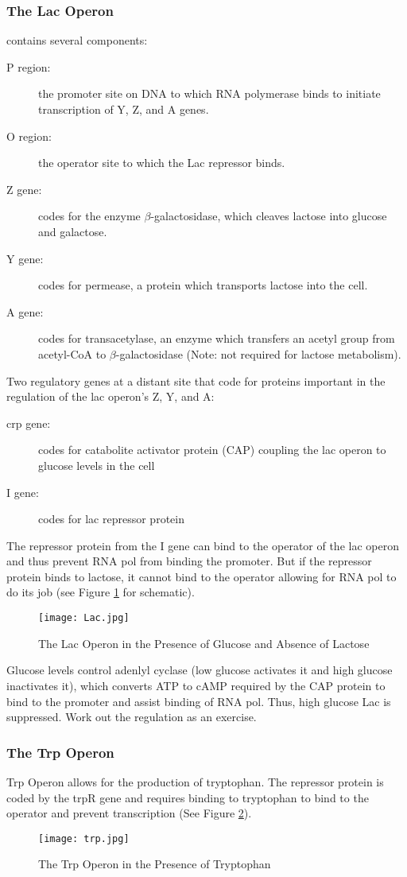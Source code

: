 \documentclass[../Bio_chemistryReview.tex]{subfiles}
\begin{document}
\subsubsection{The Lac Operon} contains several components:
\begin{description}
  \item[P region:] the promoter site on DNA to which RNA polymerase binds to
    initiate transcription of Y, Z, and A genes.
  \item[O region:] the operator site to which the Lac repressor binds.
  \item[Z gene:] codes for the enzyme $ \beta $-galactosidase, which cleaves
    lactose into glucose and galactose.
  \item[Y gene:] codes for permease, a protein which transports lactose into the
    cell.
  \item[A gene:] codes for transacetylase, an enzyme which transfers an acetyl
    group from acetyl-CoA to $ \beta $-galactosidase (Note: not required for
    lactose metabolism).
\end{description}
Two regulatory genes at a distant site that code for proteins important in the
regulation of the lac operon's Z, Y, and A:
\begin{description}
  \item[crp gene:] codes for catabolite activator protein (CAP) coupling the lac
    operon to glucose levels in the cell
  \item[I gene:] codes for lac repressor protein
\end{description}

The repressor protein from the I gene can bind to the operator of the lac operon
and thus prevent RNA pol from binding the promoter. But if the repressor protein
binds to lactose, it cannot bind to the operator allowing for RNA pol to do its
job (see Figure \ref{fig:lac} for schematic).\par
\begin{figure}[H]
  \centering
  \texttt{[image: Lac.jpg]}
  \caption{The Lac Operon in the Presence of Glucose and Absence of Lactose}
  \label{fig:lac}
\end{figure}
Glucose levels control adenlyl cyclase (low glucose activates it and high
glucose inactivates it), which converts ATP to cAMP required by the CAP protein
to bind to the promoter and assist binding of RNA pol. Thus, high glucose \imp
Lac is suppressed. Work out the regulation as an exercise.

\subsubsection{The Trp Operon}
Trp Operon allows for the production of tryptophan. The repressor protein is
coded by the trpR gene and requires binding to tryptophan to bind to the
operator and prevent transcription (See Figure \ref{fig:trp}).
\begin{figure}[H]
  \centering
  \texttt{[image: trp.jpg]}
  \caption{The Trp Operon in the Presence of Tryptophan}
  \label{fig:trp}
\end{figure}
\end{document}
